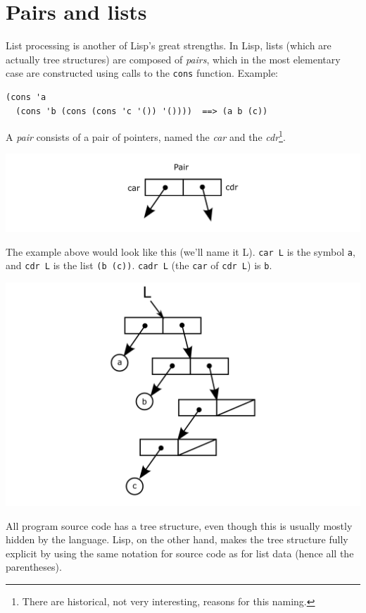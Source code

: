 \documentclass[a5paper,draft]{memoir}
\begin{document}
\section{Pairs and lists}
\label{pairs-and-lists}

List processing is another of Lisp's great strengths. In Lisp, lists (which are actually tree structures) are composed of \emph{pairs}, which in the most elementary case are constructed using calls to the \texttt{cons} function. Example:

\begin{verbatim}
(cons 'a
  (cons 'b (cons (cons 'c '()) '())))  ==> (a b (c))
\end{verbatim}

A \emph{pair} consists of a pair of pointers, named the \emph{car} and the \emph{cdr}\footnote{There are historical, not very interesting, reasons for this naming.}.

\includegraphics{images/pair.png}

The example above would look like this (we'll name it L). \texttt{car L} is the symbol \texttt{a}, and \texttt{cdr L} is the list \texttt{(b (c))}. \texttt{cadr L} (the \texttt{car} of \texttt{cdr L}) is \texttt{b}.

\includegraphics{images/tree.png}

All program source code has a tree structure, even though this is usually mostly hidden by the language. Lisp, on the other hand, makes the tree structure fully explicit by using the same notation for source code as for list data (hence all the parentheses).
\end{document}
